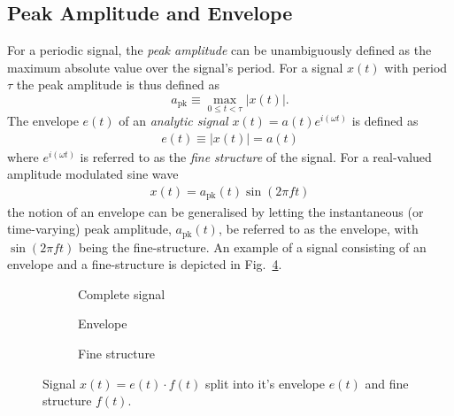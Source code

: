 \documentclass[../main2.tex]{subfiles}
\providecommand{\rootdir}{..}
\begin{document}
\subsection{Peak Amplitude and Envelope}
For a periodic signal, the \emph{peak amplitude} can be unambiguously defined as the maximum absolute value over the signal's period. For a signal $x(t)$ with period $\tau$ the peak amplitude is thus defined as
\begin{equation}
a_\text{pk} \equiv \max_{0 \leq t < \tau} |x(t)|.
\end{equation}
The envelope $e(t)$ of an \emph{analytic signal} $x(t) = a(t)e^{i(\omega t)}$ is defined as \cite{bedrosian1962analytic}
\begin{align}
e(t) \equiv |x(t)| = a(t)
\end{align}
where $e^{i(\omega t)}$ is referred to as the \emph{fine structure} of the signal. For a real-valued amplitude modulated sine wave
\begin{align}
x(t) = a_\text{pk}(t)\sin(2 \pi f t)
\end{align}
the notion of an envelope can be generalised by letting the instantaneous (or time-varying) peak amplitude, $a_\text{pk}(t)$, be referred to as the envelope, with $\sin(2 \pi f t)$ being the fine-structure. An example of a signal consisting of an envelope and a fine-structure is depicted in Fig.~\ref{fig:analytic_signal}. 
\begin{figure}
\captionsetup{justification=centering}
\begin{subfigure}{\linewidth}
\centering
\centerline{}
\caption{Complete signal}
\label{fig:signal_env_fine_struct}
\end{subfigure}
\par\bigskip
\begin{subfigure}{.5\linewidth}
\centering

\caption{Envelope}
\label{fig:signal_env}
\end{subfigure}
\begin{subfigure}{.5\linewidth}
\centering

\caption{Fine structure}
\label{fig:signal_fine_struct}
\end{subfigure}%
\caption{Signal $x(t) = e(t)\cdot f(t)$ split into it's envelope $e(t)$ and fine structure $f(t)$.}
\label{fig:analytic_signal}
\end{figure}
\end{document}
